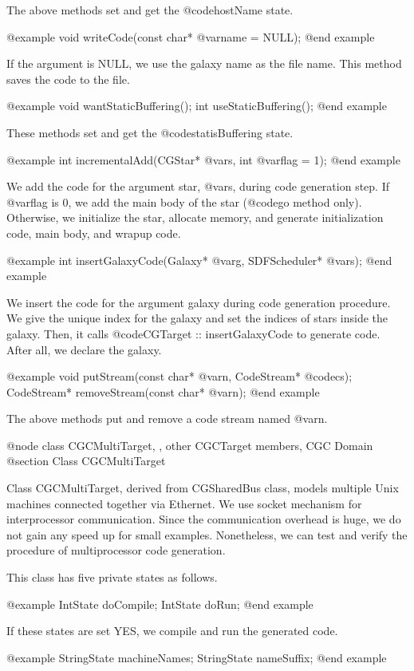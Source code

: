 {The above methods set and get the @code{hostName} state.

@example
void writeCode(const char* @var{name} = NULL);
@end example

If the argument is NULL, we use the galaxy name as the file name.
This method saves the code to the file.

@example
void wantStaticBuffering();
int useStaticBuffering();
@end example

These methods set and get the @code{statisBuffering} state.

@example
int incrementalAdd(CGStar* @var{s}, int @var{flag} = 1);
@end example

We add the code for the argument star, @var{s},  during code generation step.
If @var{flag} is 0,
we add the main body of the star (@code{go} method only). Otherwise,
we initialize the star, allocate memory, and generate initialization code,
main body, and wrapup code.

@example
int insertGalaxyCode(Galaxy* @var{g}, SDFScheduler* @var{s});
@end example

We insert the code for the argument galaxy during code generation procedure.
We give the unique index for the galaxy and set the indices of stars inside
the galaxy. Then, it calls @code{CGTarget :: insertGalaxyCode} to generate
code. After all, we declare the galaxy.

@example
void putStream(const char* @var{n}, CodeStream* @code{cs});
CodeStream* removeStream(const char* @var{n});
@end example

The above methods put and remove a code stream named @var{n}.

@node class CGCMultiTarget, , other CGCTarget members, CGC Domain
@section Class CGCMultiTarget

Class CGCMultiTarget, derived from CGSharedBus class, models multiple
Unix machines connected together via Ethernet. We use socket mechanism
for interprocessor communication. Since the communication overhead is
huge, we do not gain any speed up for small examples. Nonetheless, we
can test and verify the procedure of multiprocessor code generation.

This class has five private states as follows.

@example
IntState doCompile;
IntState doRun;
@end example

If these states are set YES, we compile and run the generated code.

@example
StringState machineNames;
StringState nameSuffix;
@end example

}
